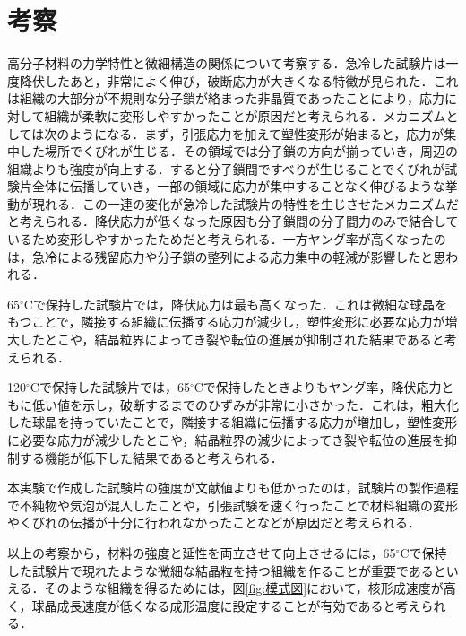 \section{考察}
高分子材料の力学特性と微細構造の関係について考察する．急冷した試験片は一度降伏したあと，非常によく伸び，破断応力が大きくなる特徴が見られた．これは組織の大部分が不規則な分子鎖が絡まった非晶質であったことにより，応力に対して組織が柔軟に変形しやすかったことが原因だと考えられる．メカニズムとしては次のようになる．まず，引張応力を加えて塑性変形が始まると，応力が集中した場所でくびれが生じる．その領域では分子鎖の方向が揃っていき，周辺の組織よりも強度が向上する．すると分子鎖間ですべりが生じることでくびれが試験片全体に伝播していき，一部の領域に応力が集中することなく伸びるような挙動が現れる．この一連の変化が急冷した試験片の特性を生じさせたメカニズムだと考えられる．降伏応力が低くなった原因も分子鎖間の分子間力のみで結合しているため変形しやすかったためだと考えられる．一方ヤング率が高くなったのは，急冷による残留応力や分子鎖の整列による応力集中の軽減が影響したと思われる．

65$^\circ$Cで保持した試験片では，降伏応力は最も高くなった．これは微細な球晶をもつことで，隣接する組織に伝播する応力が減少し，塑性変形に必要な応力が増大したとこや，結晶粒界によってき裂や転位の進展が抑制された結果であると考えられる．

120$^\circ$Cで保持した試験片では，65$^\circ$Cで保持したときよりもヤング率，降伏応力ともに低い値を示し，破断するまでのひずみが非常に小さかった．これは，粗大化した球晶を持っていたことで，隣接する組織に伝播する応力が増加し，塑性変形に必要な応力が減少したとこや，結晶粒界の減少によってき裂や転位の進展を抑制する機能が低下した結果であると考えられる．

本実験で作成した試験片の強度が文献値よりも低かったのは，試験片の製作過程で不純物や気泡が混入したことや，引張試験を速く行ったことで材料組織の変形やくびれの伝播が十分に行われなかったことなどが原因だと考えられる．

以上の考察から，材料の強度と延性を両立させて向上させるには，65$^\circ$Cで保持した試験片で現れたような微細な結晶粒を持つ組織を作ることが重要であるといえる．そのような組織を得るためには，図\ref{fig:模式図}において，核形成速度が高く，球晶成長速度が低くなる成形温度に設定することが有効であると考えられる．